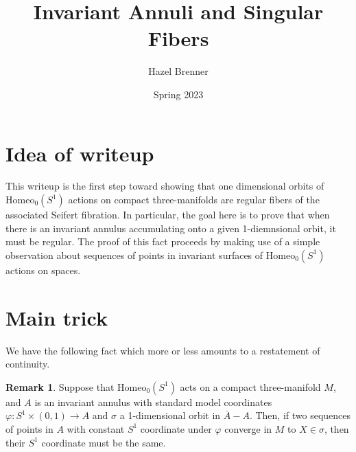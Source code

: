 \documentclass[10pt, oneside]{article}
\title{Invariant Annuli and Singular Fibers}
\author{Hazel Brenner}
\date{Spring 2023}
\newcommand{\homeoS}{\text{Homeo}_0(S^1)}
\newcommand{\cl}[1]{\overline{#1}}
\theoremstyle{definition}
\newtheorem{rem}{Remark}
\theoremstyle{definition}
\begin{document}
\maketitle

\section{Idea of writeup}

This writeup is the first step toward showing that one dimensional orbits of $\homeoS$ actions on compact three-manifolds are regular fibers of the associated Seifert fibration. In particular, the goal here is to prove that when there is an invariant annulus accumulating onto a given 1-diemnsional orbit, it must be regular. The proof of this fact proceeds by making use of a simple observation about sequences of points in invariant surfaces of $\homeoS$ actions on spaces. 

\section{Main trick}
We have the following fact which more or less amounts to a restatement of continuity.

\begin{rem}
    Suppose that $\homeoS$ acts on a compact three-manifold $M$, and $A$ is an invariant annulus with standard model coordinates $\varphi: S^1\times (0,1) \to A$ and $\sigma$ a 1-dimensional orbit in $\cl{A}- A$. Then, if two sequences of points in $A$ with constant $S^1$ coordinate under $\varphi$ converge in $M$ to $X\in\sigma$, then their $S^1$ coordinate must be the same.
\end{rem}

\end{document}
